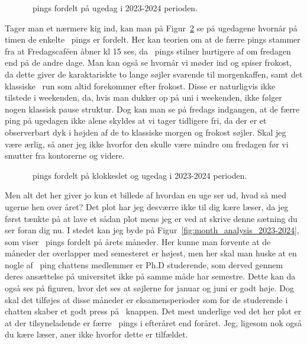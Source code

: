 \begin{article}
\begin{figure}[H]
	\centering
	\resizebox{\columnwidth}{!}{}
	\vspace{-25pt}
	\caption{\protect\coffee\ pings fordelt på ugedag i 2023-2024 perioden.}
	\label{fig:weekday_analysis_2023-2024}
\end{figure}

Tager man et nærmere kig ind, kan man på Figur~\ref{fig:weekday_analysis_hour_2023-2024} se på ugedagene hvornår på timen de enkelte \coffee\ pings er fordelt.
Her kan teorien om at de færre pings stammer fra at Fredagscaféen åbner kl 15 ses, da \coffee\ pings stilner hurtigere af om fredagen end på de andre dage. Man kan også se hvornår vi møder ind og spiser frokost, da dette giver de karaktariskte to lange søjler svarende til morgenkaffen, samt det klassiske \coffee\ run som altid forekommer efter frokost. Disse er naturligvis ikke tilstede i weekenden, da, hvis man dukker op på uni i weekenden, ikke følger nogen klassisk pause struktur.
Dog kan man se på fredags indgangen, at de færre ping på ugedagen ikke alene skyldes at vi tager tidligere fri, da der er et observerbart dyk i højden af de to klassiske morgen og frokost søjler. Skal jeg være ærlig, så aner jeg ikke hvorfor den skulle være mindre om fredagen før vi smutter fra kontorerne og videre.

\begin{figure}[H]
	\centering
	\resizebox{\columnwidth}{!}{}
	\vspace{-25pt}
	\caption{\protect\coffee\ pings fordelt på klokkeslet og ugedag i 2023-2024 perioden.}
	\label{fig:weekday_analysis_hour_2023-2024}
\end{figure}

Men alt det her giver jo kun et billede af hvordan en uge ser ud, hvad så med ugerne hen over året? Det plot har jeg desværre ikke til dig kære læser, da jeg først tænkte på at lave et sådan plot mens jeg er ved at skrive denne sætning du ser foran dig nu. I stedet kan jeg byde på Figur~\ref{fig:month_analysis_2023-2024}, som viser \coffee\ pings fordelt på årets måneder. Her kunne man forvente at de måneder der overlapper med semesteret er højest, men her skal man huske at en nogle af \coffee\ ping chattens medlemmer er Ph.D studerende, som derved gennem deres ansættelse på universitet ikke på samme måde har semestre. Dette kan da også ses på figuren, hvor det ses at søjlerne for januar og juni er godt høje. Dog skal det tilføjes at disse måneder er eksamensperioder som for de studerende i chatten skaber et godt press på \coffee\ knappen.
Det mest underlige ved det her plot er at der tilsyneladende er færre \coffee\ pings i efteråret end foråret. Jeg, ligesom nok også du kære læser, aner ikke hvorfor dette er tilfældet.


\end{article}
